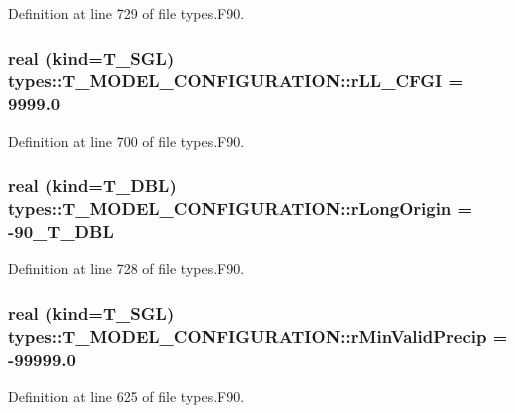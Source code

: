 Definition at line 729 of file types.F90.

\hypertarget{typetypes_1_1_t___m_o_d_e_l___c_o_n_f_i_g_u_r_a_t_i_o_n_a9345c2651d5f2bf5e4bd953cc1fb0a19}{
\subsubsection[{rLL\_\-CFGI}]{\setlength{\rightskip}{0pt plus 5cm}real (kind={\bf T\_\-SGL}) {\bf types::T\_\-MODEL\_\-CONFIGURATION::rLL\_\-CFGI} = 9999.0}}
\label{typetypes_1_1_t___m_o_d_e_l___c_o_n_f_i_g_u_r_a_t_i_o_n_a9345c2651d5f2bf5e4bd953cc1fb0a19}


Definition at line 700 of file types.F90.

\hypertarget{typetypes_1_1_t___m_o_d_e_l___c_o_n_f_i_g_u_r_a_t_i_o_n_a4f981ff8ee88ec05fcdda6fe5bd09599}{
\subsubsection[{rLongOrigin}]{\setlength{\rightskip}{0pt plus 5cm}real (kind={\bf T\_\-DBL}) {\bf types::T\_\-MODEL\_\-CONFIGURATION::rLongOrigin} = -\/90\_\-T\_\-DBL}}
\label{typetypes_1_1_t___m_o_d_e_l___c_o_n_f_i_g_u_r_a_t_i_o_n_a4f981ff8ee88ec05fcdda6fe5bd09599}


Definition at line 728 of file types.F90.

\hypertarget{typetypes_1_1_t___m_o_d_e_l___c_o_n_f_i_g_u_r_a_t_i_o_n_a77f058263705478632125ac1d964d785}{
\subsubsection[{rMinValidPrecip}]{\setlength{\rightskip}{0pt plus 5cm}real (kind={\bf T\_\-SGL}) {\bf types::T\_\-MODEL\_\-CONFIGURATION::rMinValidPrecip} = -\/99999.0}}
\label{typetypes_1_1_t___m_o_d_e_l___c_o_n_f_i_g_u_r_a_t_i_o_n_a77f058263705478632125ac1d964d785}


Definition at line 625 of file types.F90.


